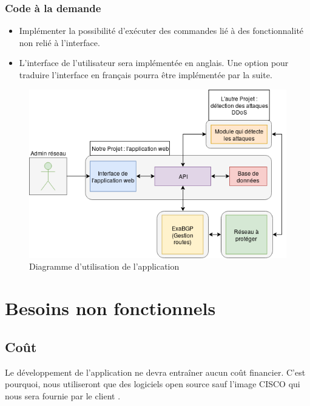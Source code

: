 
\subsubsection{Code à la demande}
\begin{itemize}
    \item Implémenter la possibilité d'exécuter des commandes lié à des fonctionnalité non relié à l'interface.
    \item L'interface de l'utilisateur sera implémentée en anglais. Une option pour traduire l'interface en français pourra être implémentée par la suite.
\end{itemize}

\begin{figure}[H]
    \includegraphics[width=\textwidth]{./medias/use_cases.png}
    \caption{Diagramme d'utilisation de l'application}
    \label{fig:use_cases}
\end{figure}

\newpage

\section{Besoins non fonctionnels}

\subsection{Coût}
Le développement de l'application ne devra entraîner aucun coût financier. C'est pourquoi, nous utiliseront que des logiciels open source sauf l'image CISCO qui nous sera fournie par le client .


